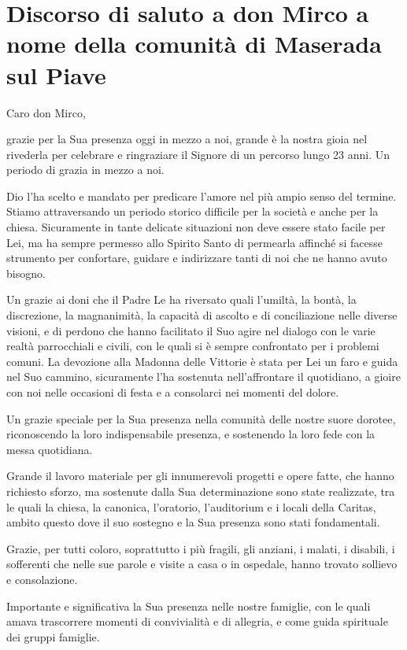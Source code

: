 \section{Discorso di saluto a don Mirco a nome della comunità di Maserada sul Piave}


Caro don Mirco,

grazie per la Sua presenza oggi in mezzo a noi, grande è la nostra gioia nel rivederla per celebrare e ringraziare il Signore di un percorso lungo 23 anni. Un periodo di grazia in mezzo a noi. 

Dio l’ha scelto e mandato per predicare l’amore nel più ampio senso del termine. Stiamo attraversando un periodo storico difficile per la società e anche per la chiesa. Sicuramente in tante delicate situazioni non deve essere stato facile per Lei, ma ha sempre permesso allo Spirito Santo di permearla affinché si facesse strumento per confortare, guidare e indirizzare tanti di noi che ne hanno avuto bisogno.

Un grazie ai doni che il Padre Le ha riversato quali l’umiltà, la bontà, la discrezione, la magnanimità, la capacità di ascolto e di conciliazione nelle diverse visioni, e di perdono che hanno facilitato il Suo agire nel dialogo con le varie realtà parrocchiali e civili, con le quali si è sempre confrontato per i problemi comuni. La devozione alla Madonna delle Vittorie è stata per Lei un faro e guida nel Suo cammino, sicuramente l’ha sostenuta nell’affrontare il quotidiano, a gioire con noi nelle occasioni di festa e a consolarci nei momenti del dolore.

Un grazie speciale per la Sua presenza nella comunità delle nostre suore dorotee, riconoscendo la loro indispensabile presenza, e sostenendo la loro fede con la messa quotidiana. 

Grande il lavoro materiale per gli innumerevoli progetti e opere fatte, che hanno richiesto sforzo, ma sostenute dalla Sua determinazione sono state realizzate, tra le quali la chiesa, la canonica, l’oratorio, l’auditorium e i locali della Caritas, ambito questo dove il suo sostegno e la Sua presenza sono stati fondamentali.

Grazie, per tutti coloro, soprattutto i più fragili, gli anziani, i malati, i disabili, i sofferenti che nelle sue parole e visite a casa o in ospedale, hanno trovato sollievo e consolazione. 

Importante e significativa la Sua presenza nelle nostre famiglie, con le quali amava trascorrere momenti di convivialità e di allegria, e come guida spirituale dei gruppi famiglie.

